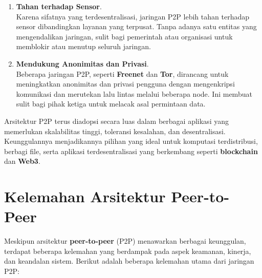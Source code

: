 \begin{enumerate}
	\item \textbf{Tahan terhadap Sensor}. \\
	Karena sifatnya yang terdesentralisasi, jaringan P2P lebih tahan terhadap sensor dibandingkan layanan yang terpusat. Tanpa adanya satu entitas yang mengendalikan jaringan, sulit bagi pemerintah atau organisasi untuk memblokir atau menutup seluruh jaringan.
	
	\item \textbf{Mendukung Anonimitas dan Privasi}. \\
	Beberapa jaringan P2P, seperti \textbf{Freenet} dan \textbf{Tor}, dirancang untuk meningkatkan anonimitas dan privasi pengguna dengan mengenkripsi komunikasi dan merutekan lalu lintas melalui beberapa node. Ini membuat sulit bagi pihak ketiga untuk melacak asal permintaan data.
\end{enumerate}

Arsitektur P2P terus diadopsi secara luas dalam berbagai aplikasi yang memerlukan skalabilitas tinggi, toleransi kesalahan, dan desentralisasi. Keunggulannya menjadikannya pilihan yang ideal untuk komputasi terdistribusi, berbagi file, serta aplikasi terdesentralisasi yang berkembang seperti \textbf{blockchain} dan \textbf{Web3}.


\section{Kelemahan Arsitektur Peer-to-Peer}

Meskipun arsitektur \textbf{peer-to-peer} (P2P) menawarkan berbagai keunggulan, terdapat beberapa kelemahan yang berdampak pada aspek keamanan, kinerja, dan keandalan sistem. Berikut adalah beberapa kelemahan utama dari jaringan P2P:

